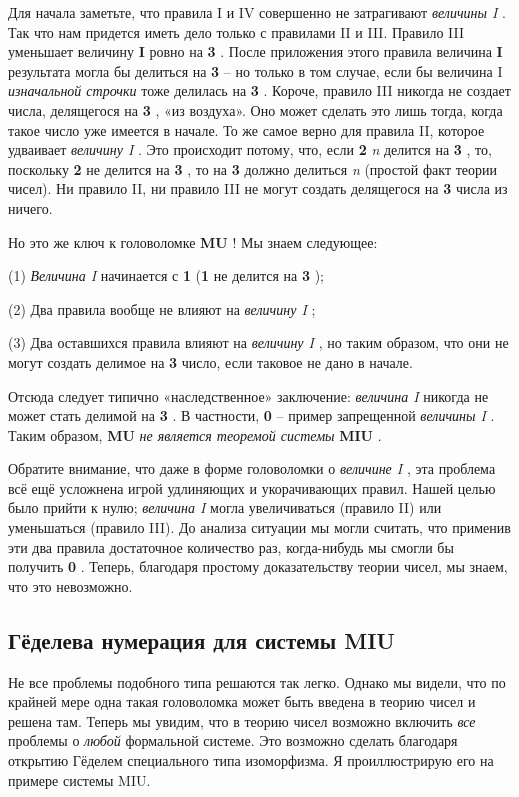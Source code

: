 \documentclass[../main.tex]{subfiles}
\begin{document}
Для начала заметьте, что правила I и IV совершенно не затрагивают \emph{величины I} . Так что нам придется иметь дело только с правилами II и III\@. Правило III уменьшает величину \textbf{I} ровно на \textbf{3} . После приложения этого правила величина \textbf{I} результата могла бы делиться на \textbf{3} \--- но только в том случае, если бы величина I \emph{изначальной строчки} тоже делилась на \textbf{3} . Короче, правило III никогда не создает числа, делящегося на \textbf{3} , «из воздуха». Оно может сделать это лишь тогда, когда такое число уже имеется в начале. То же самое верно для правила II, которое удваивает \emph{величину I} . Это происходит потому, что, если \textbf{2} \emph{n} делится на \textbf{3} , то, поскольку \textbf{2} не делится на \textbf{3} , то на \textbf{3} должно делиться \emph{n} (простой факт теории чисел). Ни правило II, ни правило III не могут создать делящегося на \textbf{3} числа из ничего.

Но это же ключ к головоломке \textbf{MU} ! Мы знаем следующее:

(1) \emph{Величина I} начинается с \textbf{1} (\textbf{1} не делится на \textbf{3} );

(2) Два правила вообще не влияют на \emph{величину I} ;

(3) Два оставшихся правила влияют на \emph{величину I} , но таким образом, что они не могут создать делимое на \textbf{3} число, если таковое не дано в начале.

Отсюда следует типично «наследственное» заключение: \emph{величина I} никогда не может стать делимой на \textbf{3} . В частности, \textbf{0} \--- пример запрещенной \emph{величины I} . Таким образом, \textbf{MU} \emph{не является теоремой системы} \textbf{MIU} .

Обратите внимание, что даже в форме головоломки о \emph{величине I} , эта проблема всё ещё усложнена игрой удлиняющих и укорачивающих правил. Нашей целью было прийти к нулю; \emph{величина I} могла увеличиваться (правило II) или уменьшаться (правило III). До анализа ситуации мы могли считать, что применив эти два правила достаточное количество раз, когда-нибудь мы смогли бы получить \textbf{0} . Теперь, благодаря простому доказательству теории чисел, мы знаем, что это невозможно.


\subsection{Гёделева нумерация для системы MIU}

Не все проблемы подобного типа решаются так легко. Однако мы видели, что по крайней мере одна такая головоломка может быть введена в теорию чисел и решена там. Теперь мы увидим, что в теорию чисел возможно включить \emph{все} проблемы о \emph{любой} формальной системе. Это возможно сделать благодаря открытию Гёделем специального типа изоморфизма. Я проиллюстрирую его на примере системы MIU.
\end{document}
